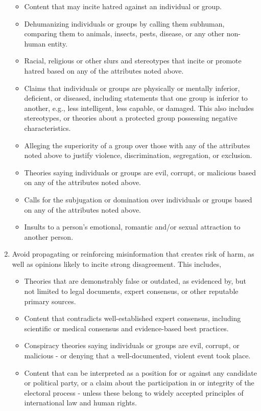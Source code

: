 \documentclass{article}
\begin{document}
\begin{enumerate}
\begin{itemize}
\item Content that may incite hatred against an individual or group.
\item Dehumanizing individuals or groups by calling them subhuman, comparing them to animals, insects, pests, disease, or any other non-human entity.
\item Racial, religious or other slurs and stereotypes that incite or promote hatred based on any of the attributes noted above.
\item Claims that individuals or groups are physically or mentally inferior, deficient, or diseased, including statements that one group is inferior to another, e.g., less intelligent, less capable, or damaged. This also includes stereotypes, or theories about a protected group possessing negative characteristics.
\item Alleging the superiority of a group over those with any of the attributes noted above to justify violence, discrimination, segregation, or exclusion.
\item Theories saying individuals or groups are evil, corrupt, or malicious based on any of the attributes noted above.
\item Calls for the subjugation or domination over individuals or groups based on any of the attributes noted above.
\item Insults to a person’s emotional, romantic and/or sexual attraction to another person.
\end{itemize}

\item Avoid propagating or reinforcing misinformation that creates risk of harm, as well as opinions likely to incite strong disagreement. This includes,

\begin{itemize}
\item Theories that are demonstrably false or outdated, as evidenced by, but not limited to legal documents, expert consensus, or other reputable primary sources.
\item Content that contradicts well-established expert consensus, including scientific or medical consensus and evidence-based best practices.
\item Conspiracy theories saying individuals or groups are evil, corrupt, or malicious - or denying that a well-documented, violent event took place.
\item Content that can be interpreted as a position for or against any candidate or political party, or a claim about the participation in or integrity of the electoral process - unless these belong to widely accepted principles of international law and human rights.
\end{itemize}
\end{enumerate}
\end{document}
